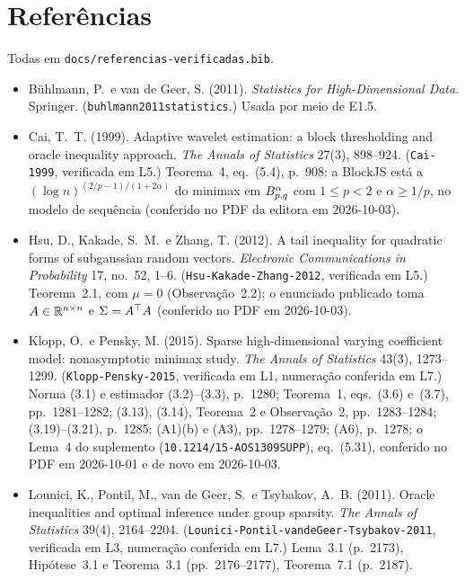 \documentclass[11pt,a4paper]{article}
\begin{document}
\section*{Referências}
\sloppy

Todas em \texttt{docs/referencias-verificadas.bib}.

\begin{itemize}[nosep, leftmargin=*]
  \item Bühlmann, P.\ e van de Geer, S. (2011). \emph{Statistics for
    High-Dimensional Data}. Springer. (\texttt{buhlmann2011statistics}.)
    Usada por meio de E1.5.
  \item Cai, T.~T. (1999). Adaptive wavelet estimation: a block thresholding
    and oracle inequality approach. \emph{The Annals of Statistics} 27(3),
    898--924. (\texttt{Cai-1999}, verificada em L5.) Teorema~4, eq.~(5.4),
    p.~908: a BlockJS está a $(\log n)^{(2/p-1)/(1+2\alpha)}$ do minimax em
    $B^{\alpha}_{p,q}$ com $1 \le p < 2$ e $\alpha \ge 1/p$, no modelo de
    sequência (conferido no PDF da editora em 2026-10-03).
  \item Hsu, D., Kakade, S.~M.\ e Zhang, T. (2012). A tail inequality for
    quadratic forms of subgaussian random vectors. \emph{Electronic
    Communications in Probability} 17, no.~52, 1--6.
    (\texttt{Hsu-Kakade-Zhang-2012}, verificada em L5.) Teorema~2.1, com
    $\mu = 0$ (Observação~2.2); o enunciado publicado toma
    $A \in \mathbb{R}^{n\times n}$ e $\Sigma = A^{\top} A$ (conferido no PDF em
    2026-10-03).
  \item Klopp, O.\ e Pensky, M. (2015). Sparse high-dimensional varying
    coefficient model: nonasymptotic minimax study. \emph{The Annals of
    Statistics} 43(3), 1273--1299. (\texttt{Klopp-Pensky-2015}, verificada em
    L1, numeração conferida em L7.) Norma (3.1) e estimador (3.2)--(3.3),
    p.~1280; Teorema~1, eqs.~(3.6) e~(3.7), pp.~1281--1282; (3.13), (3.14),
    Teorema~2 e Observação~2, pp.~1283--1284; (3.19)--(3.21), p.~1285; (A1)(b)
    e (A3), pp.~1278--1279; (A6), p.~1278; o Lema~4 do suplemento
    (\texttt{10.1214/15-AOS1309SUPP}), eq.~(5.31), conferido no PDF em
    2026-10-01 e de novo em 2026-10-03.
  \item Lounici, K., Pontil, M., van de Geer, S.\ e Tsybakov, A.~B. (2011).
    Oracle inequalities and optimal inference under group sparsity.
    \emph{The Annals of Statistics} 39(4), 2164--2204.
    (\texttt{Lounici-Pontil-vandeGeer-Tsybakov-2011}, verificada em L3,
    numeração conferida em L7.) Lema~3.1 (p.~2173), Hipótese~3.1 e
    Teorema~3.1 (pp.~2176--2177), Teorema~7.1 (p.~2187).
\end{itemize}
\end{document}
